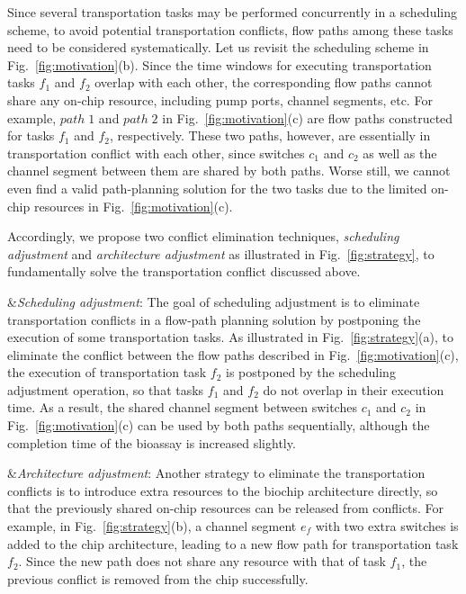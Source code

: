 Since several transportation tasks may be performed concurrently in a scheduling scheme,
to avoid potential transportation conflicts, flow paths among these tasks need to be considered systematically. Let us revisit the scheduling scheme in Fig.~\ref{fig:motivation}(b). Since the time windows for executing transportation tasks $f_1$ and $f_2$ overlap with each other, the corresponding flow paths cannot share any on-chip resource, including pump ports, channel segments, etc. For example, $path\;1$ and $path\;2$ in Fig.~\ref{fig:motivation}(c) are flow paths constructed for tasks $f_1$ and $f_2$, respectively. These two paths, however, are essentially in transportation conflict with each other, since switches $c_1$ and $c_2$ as well as the channel segment between them are shared by both paths. Worse still, we cannot even find a valid path-planning solution for the two tasks due to the limited on-chip resources in Fig.~\ref{fig:motivation}(c).

Accordingly, we propose two conflict elimination techniques, \textsl{scheduling adjustment} and \textsl{architecture adjustment} as illustrated in Fig.~\ref{fig:strategy}, to fundamentally solve the transportation conflict discussed above. %


\begin{easylist}
&\textit{Scheduling adjustment}: The goal of scheduling adjustment is to eliminate transportation conflicts in a flow-path planning solution by postponing the execution of some transportation tasks. As illustrated in Fig.~\ref{fig:strategy}(a), to eliminate the conflict between the flow paths described in Fig.~\ref{fig:motivation}(c), the execution of transportation task $f_2$ is postponed by the scheduling adjustment operation, so that tasks $f_1$ and $f_2$ do not overlap in their execution time. As a result, the shared channel segment between switches $c_1$ and $c_2$ in Fig.~\ref{fig:motivation}(c) can be used by both paths sequentially, although the completion time of the bioassay is increased slightly.

&\textit{Architecture adjustment}: Another strategy to eliminate the transportation conflicts is to introduce extra resources to the biochip architecture directly, so that the previously shared on-chip resources can be released from conflicts. For example, in Fig.~\ref{fig:strategy}(b), a channel segment $e_f$ with two extra switches is added to the chip architecture, leading to a new flow path for transportation task $f_2$. Since the new path does not share any resource with that of task $f_1$, the previous conflict is removed from the chip successfully.

\end{easylist}

